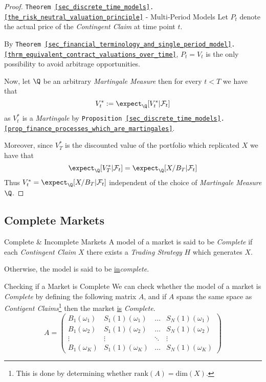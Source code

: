 \documentclass[11pt,a4paper]{article}
\begin{document}
  \begin{proof}{\texttt{Theorem \ref{sec_discrete_time_models}.\ref{the_risk_neutral_valuation_principle}} - Multi-Period Models}\label{prf_risk_neutral_valuation_principle_multi_period}
    Let $P_t$ denote the actual price of the \textit{Contingent Claim} at time point $t$.
    \par By \texttt{Theorem \ref{sec_financial_terminology_and_single_period_model}.\ref{thrm_equivalent_contract_valuations_over_time}}, $P_t=V_t$ is the only possibility to avoid arbitrage opportunities.
    \par Now, let $\Q$ be an arbitrary \textit{Martingale Measure} then for every $t<T$ we have that
    \[ V_t^*:=\expect_\Q[V_t^*|\mathcal{F}_t] \]
    as $V_t^*$ is a \textit{Martingale} by \texttt{Proposition \ref{sec_discrete_time_models}.\ref{prop_finance_processes_which_are_martingales}}.
    \par Moreover, since $V_T^*$ is the discounted value of the portfolio which replicated $X$ we have that
    \[ \expect_\Q[V_T^*|\mathcal{F}_t]=\expect_\Q[X/B_T|\mathcal{F}_t] \]
    Thus $V_t^*=\expect_\Q[X/B_T|\mathcal{F}_t]$ independent of the choice of \textit{Martingale Measure} $\Q$.\proved
  \end{proof}

\subsection{Complete Markets}

  \begin{definition}{Complete \& Incomplete Markets}
    A model of a market is said to be \textit{Complete} if each \textit{Contingent Claim} $X$ there exists a \textit{Trading Strategy} $H$ which generates $X$.
    \par Otherwise, the model is said to be \underline{in}\textit{complete}.
  \end{definition}

  \begin{remark}{Checking if a Market is Complete}
    We can check whether the model of a market is \textit{Complete} by defining the following matrix $A$, and if $A$ spans the same space as \textit{Contigent Claims}\footnote{This is done by determining whether $\text{rank}(A)=\text{dim}(X)$.} then the market \underline{is} \textit{Complete}.
    \[ A=\begin{pmatrix}
        B_1(\omega_1)&S_1(1)(\omega_1)&\dots&S_N(1)(\omega_1)\\
        B_1(\omega_2)&S_1(1)(\omega_2)&\dots&S_N(1)(\omega_2)\\
        \vdots&\vdots&\ddots&\vdots\\
        B_1(\omega_K)&S_1(1)(\omega_K)&\dots&S_N(1)(\omega_K)
    \end{pmatrix} \]
  \end{remark}
\end{document}
